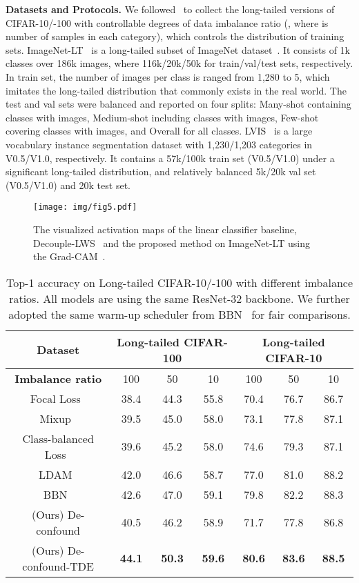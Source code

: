 \documentclass{article}
\begin{document}
\textbf{Datasets and Protocols.} We followed~\cite{cao2019learning, zhou2019bbn} to collect the long-tailed versions of CIFAR-10/-100 with controllable degrees of data imbalance ratio (, where  is number of samples in each category), which controls the distribution of training sets. ImageNet-LT~\cite{liu2019large} is a long-tailed subset of ImageNet dataset~\cite{russakovsky2015imagenet}. It consists of 1k classes over 186k images, where 116k/20k/50k for train/val/test sets, respectively. In train set, the number of images per class is ranged from 1,280 to 5, which imitates the long-tailed distribution that commonly exists in the real world. The test and val sets were balanced and reported on four splits: Many-shot containing classes with  images, Medium-shot including classes with  images, Few-shot covering classes with  images, and Overall for all classes. LVIS~\cite{gupta2019lvis} is a large vocabulary instance segmentation dataset with 1,230/1,203 categories in V0.5/V1.0, respectively. It contains a 57k/100k train set (V0.5/V1.0) under a significant long-tailed distribution, and relatively balanced 5k/20k val set (V0.5/V1.0) and 20k test set.

\begin{figure}[t]
   \texttt{[image: img/fig5.pdf]}
   \caption{The visualized activation maps of the linear classifier baseline, Decouple-LWS~\cite{kang2019decoupling} and the proposed method on ImageNet-LT using the Grad-CAM~\cite{selvaraju2017grad}.}
   \label{fig:5} \end{figure}


\begin{table}
\centering
\scalebox{0.9}
{
\begin{tabular}{c| c | c | c | c | c | c}
\hline
\hline
Dataset & \multicolumn{3}{c}{Long-tailed CIFAR-100} & \multicolumn{3}{|c}{Long-tailed CIFAR-10} \\ 
\hline 
\textbf{Imbalance ratio} & 100 & 50 & 10 & 100 & 50 & 10 \\
\hline
\hline
Focal Loss~\cite{lin2017focal} & 38.4 & 44.3 & 55.8 & 70.4 & 76.7 & 86.7   \\
Mixup~\cite{zhang2018mixup} & 39.5 & 45.0 & 58.0 & 73.1 & 77.8 & 87.1 \\
Class-balanced Loss~\cite{cui2019class} & 39.6 & 45.2 & 58.0 & 74.6 & 79.3 & 87.1 \\
LDAM~\cite{cao2019learning} & 42.0 & 46.6 & 58.7 & 77.0 & 81.0 & 88.2 \\
BBN~\cite{zhou2019bbn} & 42.6 & 47.0 & 59.1 & 79.8 & 82.2 & 88.3 \\
\hline
(Ours) De-confound & 40.5 & 46.2 & 58.9 & 71.7 & 77.8 & 86.8\\
(Ours) De-confound-TDE & \textbf{44.1} & \textbf{50.3} & \textbf{59.6} & \textbf{80.6} & \textbf{83.6} & \textbf{88.5}\\
\hline
\hline
\end{tabular}
}
\caption{Top-1 accuracy on Long-tailed CIFAR-10/-100 with different imbalance ratios. All models are using the same ResNet-32 backbone. We further adopted the same warm-up scheduler from BBN~\cite{zhou2019bbn} for fair comparisons.}
\label{tab:rebuttal_1}
\vspace{-5mm}
\end{table}
\end{document}
